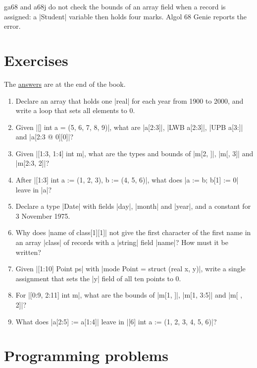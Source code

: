 \begin{implnote}
ga68 and a68j do not check the bounds of an array field when a record is
assigned: a \code|Student| variable then holds four marks. Algol 68 Genie
reports the error.
\end{implnote}

\section*{Exercises}

The \hyperref[ans-ch4]{answers} are at the end of the book.

\begin{enumerate}
\item Declare an array that holds one \code|real| for each year from 1900
  to 2000, and write a loop that sets all elements to 0.
\item Given \code|[] int a = (5, 6, 7, 8, 9)|, what are \code|a[2:3]|,
  \code|LWB a[2:3]|, \code|UPB a[3:]| and \code|a[2:3 @ 0][0]|?
\item Given \code|[1:3, 1:4] int m|, what are the types and bounds of
  \code|m[2, ]|, \code|m[, 3]| and \code|m[2:3, 2]|?
\item After \code|[1:3] int a := (1, 2, 3), b := (4, 5, 6)|, what does
  \code|a := b; b[1] := 0| leave in \code|a|?
\item Declare a type \code|Date| with fields \code|day|, \code|month| and
  \code|year|, and a constant for 3 November 1975.
\item Why does \code|name of class[1][1]| not give the first character of
  the first name in an array \code|class| of records with a
  \code|string| field \code|name|? How must it be written?
\item Given \code|[1:10] Point ps| with \code|mode Point = struct (real x, y)|,
  write a single assignment that sets the \code|y| field of all ten points
  to 0.
\item For \code|[0:9, 2:11] int m|, what are the bounds of \code|m[1, ]|,
  \code|m[1, 3:5]| and \code|m[ , 2]|?
\item What does \code|a[2:5] := a[1:4]| leave in
  \code|[6] int a := (1, 2, 3, 4, 5, 6)|?
\end{enumerate}

\section*{Programming problems}

